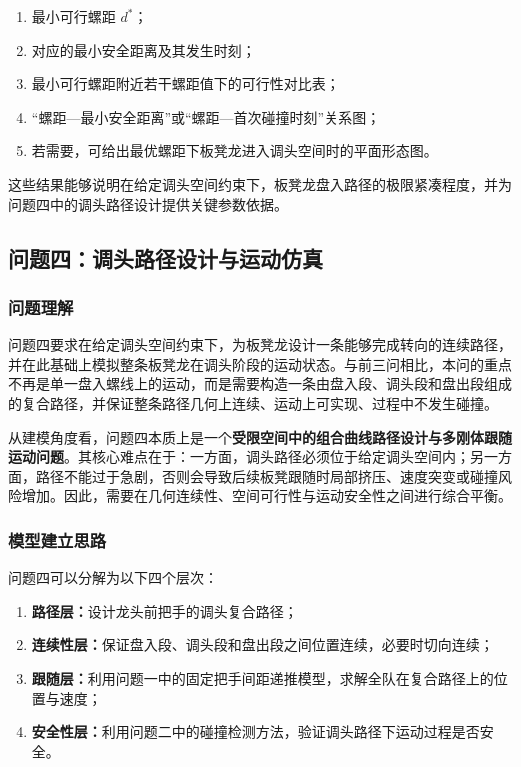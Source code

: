 \documentclass[12pt,a4paper]{ctexart}
\begin{document}
\begin{enumerate}
    \item 最小可行螺距 $d^\ast$；
    \item 对应的最小安全距离及其发生时刻；
    \item 最小可行螺距附近若干螺距值下的可行性对比表；
    \item “螺距—最小安全距离”或“螺距—首次碰撞时刻”关系图；
    \item 若需要，可给出最优螺距下板凳龙进入调头空间时的平面形态图。
\end{enumerate}

\noindent 这些结果能够说明在给定调头空间约束下，板凳龙盘入路径的极限紧凑程度，并为问题四中的调头路径设计提供关键参数依据。

\subsection{问题四：调头路径设计与运动仿真}

\subsubsection{问题理解}
问题四要求在给定调头空间约束下，为板凳龙设计一条能够完成转向的连续路径，并在此基础上模拟整条板凳龙在调头阶段的运动状态。与前三问相比，本问的重点不再是单一盘入螺线上的运动，而是需要构造一条由盘入段、调头段和盘出段组成的复合路径，并保证整条路径几何上连续、运动上可实现、过程中不发生碰撞。

从建模角度看，问题四本质上是一个\textbf{受限空间中的组合曲线路径设计与多刚体跟随运动问题}。其核心难点在于：一方面，调头路径必须位于给定调头空间内；另一方面，路径不能过于急剧，否则会导致后续板凳跟随时局部挤压、速度突变或碰撞风险增加。因此，需要在几何连续性、空间可行性与运动安全性之间进行综合平衡。

\subsubsection{模型建立思路}
问题四可以分解为以下四个层次：

\begin{enumerate}
    \item \textbf{路径层：}设计龙头前把手的调头复合路径；
    \item \textbf{连续性层：}保证盘入段、调头段和盘出段之间位置连续，必要时切向连续；
    \item \textbf{跟随层：}利用问题一中的固定把手间距递推模型，求解全队在复合路径上的位置与速度；
    \item \textbf{安全性层：}利用问题二中的碰撞检测方法，验证调头路径下运动过程是否安全。
\end{enumerate}
\end{document}
